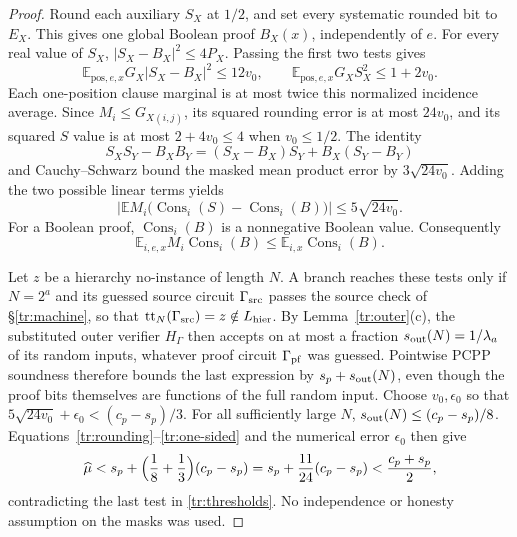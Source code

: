 \documentclass[11pt,letterpaper]{article}
\theoremstyle{definition}
\theoremstyle{remark}
\begin{document}
\begin{proof}
Round each auxiliary $S_X$ at $1/2$, and set every systematic rounded
bit to $E_X$. This gives one global Boolean proof $B_X(x)$, independently
of $e$. For every real value of $S_X$,
$|S_X-B_X|^2\le4P_X$. Passing the first two tests gives
\[
 \mathbb E_{\mathrm{pos},e,x}G_X|S_X-B_X|^2\le12v_0,
 \qquad
 \mathbb E_{\mathrm{pos},e,x}G_XS_X^2\le1+2v_0.
\]
Each one-position clause marginal is at most twice this normalized
incidence average. Since $M_i\le G_{X(i,j)}$, its squared rounding
error is at most $24v_0$, and its squared $S$ value is at most
$2+4v_0\le4$ when $v_0\le1/2$.
The identity
\[
 S_XS_Y-B_XB_Y=(S_X-B_X)S_Y+B_X(S_Y-B_Y)
\]
and Cauchy--Schwarz bound the masked mean product error by
$3\sqrt{24v_0}$. Adding the two possible linear terms yields
\begin{equation}
 \left|\mathbb E M_i\bigl(\operatorname{Cons}_i(S)
                  -\operatorname{Cons}_i(B)\bigr)\right|
 \le5\sqrt{24v_0}.
 \label{tr:rounding}
\end{equation}
For a Boolean proof, $\operatorname{Cons}_i(B)$ is a nonnegative
Boolean value. Consequently
\begin{equation}
 \mathbb E_{i,e,x}M_i\operatorname{Cons}_i(B)
 \le\mathbb E_{i,x}\operatorname{Cons}_i(B).
 \label{tr:one-sided}
\end{equation}

Let $z$ be a hierarchy no-instance of length $N$. A branch reaches
these tests only if $N=2^a$ and its guessed source circuit
$\Gamma_{\rm src}$ passes the source check of \S\ref{tr:machine}, so
that $\mathrm{tt}_N(\Gamma_{\rm src})=z\notin L_{\rm hier}$. By
Lemma~\ref{tr:outer}(c), the substituted outer verifier $H_\Gamma$ then
accepts on at most a fraction $s_{\rm out}(N)=1/\lambda_a$ of its random
inputs, whatever proof circuit $\Gamma_{\rm pf}$ was guessed. Pointwise
PCPP soundness therefore bounds the last expression by
$s_p+s_{\rm out}(N)$, even though the proof bits themselves are
functions of the full random input.
Choose $v_0,\epsilon_0$ so that
$5\sqrt{24v_0}+\epsilon_0<(c_p-s_p)/3$.
For all sufficiently large $N$, $s_{\rm out}(N)\le(c_p-s_p)/8$.
Equations~\eqref{tr:rounding}--\eqref{tr:one-sided} and the numerical
error $\epsilon_0$ then give
\[
 \widehat\mu<s_p+\Bigl(\frac18+\frac13\Bigr)(c_p-s_p)
 =s_p+\frac{11}{24}(c_p-s_p)<\frac{c_p+s_p}2,
\]
contradicting the last test in \eqref{tr:thresholds}.
No independence or honesty assumption on the masks was used.
\end{proof}
\end{document}
